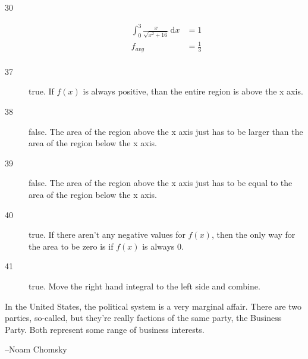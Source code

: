 \documentclass{exam}
\begin{document}
\begin{description}
\item[30]
\begin{align*}
  \int_0^3 \frac{x}{\sqrt{x^2 + 16}}\, \mathrm{d}x &= 1 \\
  f_{avg} &= \frac{1}{3} \\
\end{align*}

\item[37]
true.  If $f(x)$ is always positive, than the entire region is above the x axis.

\item[38]
false.  The area of the region above the x axis just has to be larger than the area of the region below the x axis.

\item[39]
false.  The area of the region above the x axis just has to be equal to the area of the region below the x axis.

\item[40]
true.  If there aren't any negative values for $f(x)$, then the only way for the area to be zero is if $f(x)$ is always 0.

\item[41]
true.  Move the right hand integral to the left side and combine.

\end{description}

\else

\vspace{8 cm}


{In the United States, the political system is a very marginal affair. There are two parties, so-called, but they're
  really factions of the same party, the Business Party. Both represent some range of business interests.}
\vspace{.2 cm}

\hspace{0.5 cm} --Noam Chomsky





\fi
\end{document}
